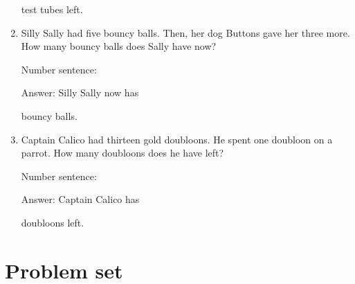 \documentclass{tufte-book}
\begin{document}
\begin{enumerate}
  test tubes left.
\item
  Silly Sally had five bouncy balls. Then, her dog Buttons gave her
  three more. How many bouncy balls does Sally have now?\medskip\par
  Number sentence:
  \dotfill\medskip\par
  Answer: Silly Sally now has
  \dotfill\medskip\par\mbox{}\dotfill\medskip\par\mbox{}\dotfill\bigskip
  bouncy balls.
\item
  Captain Calico had thirteen gold doubloons. He spent one doubloon on a
  parrot. How many doubloons does he have left?\medskip\par
  Number sentence:
  \dotfill\medskip\par
  Answer: Captain Calico has
  \dotfill\medskip\par\mbox{}\dotfill\medskip\par\mbox{}\dotfill\bigskip
  doubloons left.
\end{enumerate}



\clearpage\section{Problem set }
\end{document}
